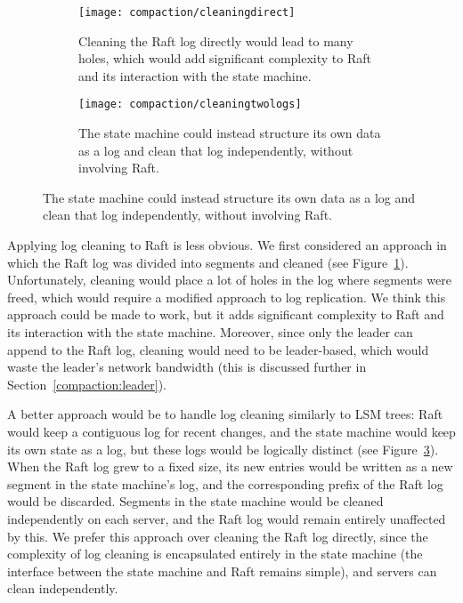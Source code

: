 \begin{figure}
\centering

\begin{subfigure}{\textwidth}
\centering
\texttt{[image: compaction/cleaningdirect]}
\caption{
Cleaning the Raft log directly would lead to many holes, which would
add significant complexity to Raft and its interaction with the state
machine.
}
\label{fig:compaction:incremental:cleaningdirect}
\end{subfigure}

\vspace{2ex}

\begin{subfigure}{\textwidth}
\centering
\texttt{[image: compaction/cleaningtwologs]}
\caption{
The state machine could instead structure its own data as a log and
clean that log independently, without involving Raft.
}
\label{fig:compaction:incremental:cleaningtwologs}
\end{subfigure}

\end{figure}

Applying log cleaning to Raft is less obvious. We first considered an
approach in which the Raft log was divided into segments and cleaned
(see Figure~\ref{fig:compaction:incremental:cleaningdirect}).
Unfortunately, cleaning would place a lot of holes in the log where
segments were freed, which would require a modified approach to log
replication. We think this approach could be made to work, but it adds
significant complexity to Raft and its interaction with the state
machine. Moreover, since only the leader can append to the Raft log,
cleaning would need to be leader-based, which would waste the leader's
network bandwidth (this is discussed further in
Section~\ref{compaction:leader}).


A better approach would be to handle log cleaning similarly to LSM
trees: Raft would keep a contiguous log for recent changes, and the
state machine would keep its own state as a log, but these logs would be
logically distinct (see
Figure~\ref{fig:compaction:incremental:cleaningtwologs}). When the Raft
log grew to a fixed size, its new entries would be written as a new
segment in the state machine's log, and the corresponding prefix of the
Raft log would be discarded. Segments in the state machine would be
cleaned independently on each server, and the Raft log would remain
entirely unaffected by this. We prefer this approach over cleaning the
Raft log directly, since the complexity of log cleaning is encapsulated
entirely in the state machine (the interface between the state machine
and Raft remains simple), and servers can clean independently.

